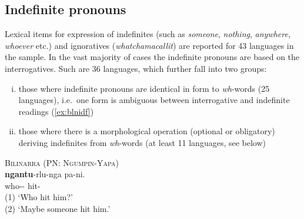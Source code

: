 \documentclass[12pt,egregdoesnotlikesansseriftitles]{scrartcl}
\begin{document}
\subsection{Indefinite pronouns}
\label{sec:indefs}
Lexical items for expression of indefinites (such as \textit{someone}, \textit{nothing}, \textit{anywhere}, \textit{whoever} etc.) and ignoratives (\textit{whatchamacallit}) are reported for 43 languages in the sample. In the vast majority of cases the indefinite pronouns are based on the interrogatives. Such are 36 languages, which further fall into two groups:
\begin{enumerate}[(i)]
\item those where indefinite pronouns are identical in form to \textit{wh}-words (25 languages), i.e.\ one form is ambiguous between interrogative and indefinite readings (\ref{ex:blnidf})
\item those where there is a morphological operation (optional or obligatory) deriving indefinites from \textit{wh}-words (at least 11 languages, see below)
\end{enumerate}
\begin{exe}
  \ex\label{ex:blnidf} \textsc{Bilinarra (PN: Ngumpin-Yapa)}\hfill {}\\
  \gll \textbf{ngantu}-rlu-nga pa-ni.\\
  who-\Erg-\Dub{} hit-\Pst{}\\
  \glt (1) `Who hit him?'\\
  (2) `Maybe someone hit him.'
\end{exe}
\end{document}
